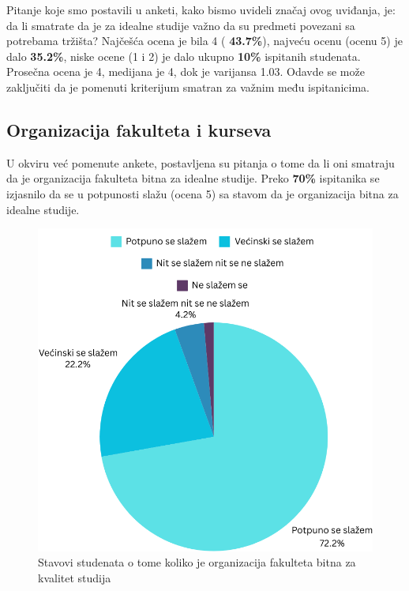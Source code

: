 \documentclass[a4paper]{article}
\begin{document}
{Pitanje koje smo postavili u anketi, kako bismo uvideli značaj ovog uviđanja, je: da li smatrate da je za idealne studije važno da su predmeti povezani sa potrebama tržišta? Najčešća ocena je bila 4 ( \textbf{43.7\%}), najveću ocenu (ocenu 5) je dalo \textbf{35.2\%}, niske ocene (1 i 2) je dalo ukupno \textbf{10\%} ispitanih studenata. Prosečna ocena je 4, medijana je 4, dok je varijansa 1.03. Odavde se može zaključiti da je pomenuti kriterijum smatran za važnim među ispitanicima.


\subsection{Organizacija fakulteta i kurseva}
\label{subsec:organizacija_stavovi}

U okviru već pomenute ankete, postavljena su pitanja o tome da li oni smatraju da je organizacija fakulteta bitna za idealne studije. Preko \textbf{70\%} ispitanika se izjasnilo da se u potpunosti slažu (ocena 5) sa stavom da je organizacija bitna za idealne studije.
\begin{figure}[h!]
\begin{center}
    \includegraphics[scale = 0.3]{PieChartOrganizacija.png}
    \caption{Stavovi studenata o tome koliko je organizacija fakulteta bitna za kvalitet studija}
    \label{fig:organizacija}
\end{center}
\end{figure}

}
\end{document}
